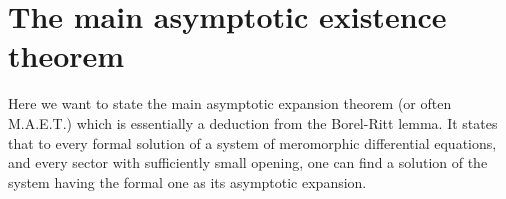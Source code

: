 \section{The main asymptotic existence theorem}
\TODO[move] 
\begin{comment}
  \begin{multicols}{2}
    \textbf{Classical:}
    \begin{itemize}
      \item \cite[Thm.4.4.1]{Loday2014}
      \item \cite[Thm.7.10]{van2003galois}{\tiny\cite[Thm.7.12]{van2003galois}}
      \item \cite[Thm.12.1]{wasow2002asymptotic}
      \item \cite[5.3.Thm.1]{Varadarajan96linearmeromorphic}
      \item \cite[207]{Balser2000Formal}: Some historical remarks
      \item \cite[Thm.A]{BJL1979Birkhoff}
    \end{itemize}
  \columnbreak
    \textbf{Sheafical:}
    \begin{itemize}
      \item \cite[Thm.2.3.1]{sabbah_cimpa90}
      \item \cite[Sec.4.4]{Loday2014}
    \end{itemize}
  \end{multicols}
\end{comment}
Here we want to state the main asymptotic expansion theorem (or often M.A.E.T.)
which is essentially a deduction from the Borel-Ritt lemma.
It states that to every formal solution of a system of meromorphic differential
equations, and every sector with sufficiently small opening, one can find a
solution of the system having the formal one as its asymptotic expansion.

